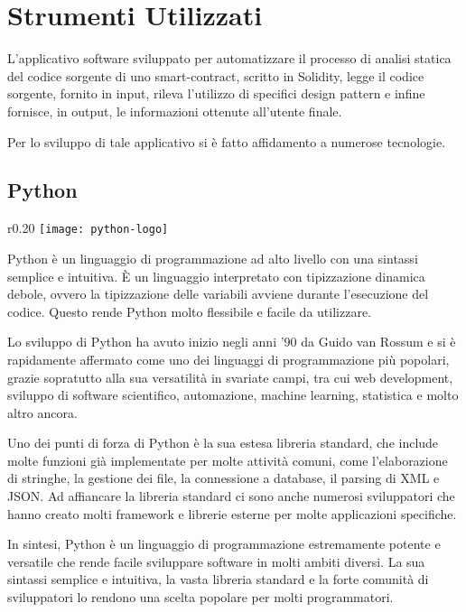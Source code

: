 \chapter{Strumenti Utilizzati}
L'applicativo software sviluppato per automatizzare il processo di analisi statica del codice sorgente di uno smart-contract, scritto in Solidity, legge il codice sorgente, fornito in input, rileva l'utilizzo di specifici design pattern e infine fornisce, in output, le informazioni ottenute all'utente finale.\par
Per lo sviluppo di tale applicativo si è fatto affidamento a numerose tecnologie.

{\section{Python}

\begin{wrapfigure}{r}{0.20\textwidth}
	\centering
	\texttt{[image: python-logo]}
\end{wrapfigure}
Python\cite{python} è un linguaggio di programmazione ad alto livello con una sintassi semplice e intuitiva. È un linguaggio interpretato con tipizzazione dinamica debole, ovvero la tipizzazione delle variabili avviene durante l'esecuzione del codice. Questo rende Python molto flessibile e facile da utilizzare.\par
Lo sviluppo di Python ha avuto inizio negli anni '90 da Guido van Rossum e si è rapidamente affermato come uno dei linguaggi di programmazione più popolari, grazie sopratutto alla sua versatilità in svariate campi, tra cui web development, sviluppo di software scientifico, automazione, machine learning, statistica e molto altro ancora.\par
Uno dei punti di forza di Python è la sua estesa libreria standard, che include molte funzioni già implementate per molte attività comuni, come l'elaborazione di stringhe, la gestione dei file, la connessione a database, il parsing di XML e JSON. Ad affiancare la libreria standard ci sono anche numerosi sviluppatori che hanno creato molti framework e librerie esterne per molte applicazioni specifiche.\par
In sintesi, Python è un linguaggio di programmazione estremamente potente e versatile che rende facile sviluppare software in molti ambiti diversi. La sua sintassi semplice e intuitiva, la vasta libreria standard e la forte comunità di sviluppatori lo rendono una scelta popolare per molti programmatori.

}
